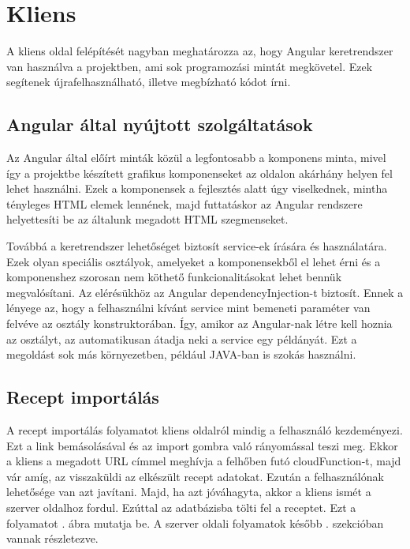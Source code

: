 \documentclass[12pt]{report}
\theoremstyle{definition}
\begin{document}
\section{Kliens}
A kliens oldal felépítését nagyban meghatározza az, hogy Angular keretrendszer van használva a projektben, ami sok programozási mintát megkövetel. Ezek segítenek újrafelhasználható, illetve megbízható kódot írni.



\subsection{Angular által nyújtott szolgáltatások}
Az Angular által előírt minták közül a legfontosabb a komponens minta, mivel így a projektbe  készített grafikus komponenseket az oldalon akárhány helyen fel lehet használni. Ezek a komponensek a fejlesztés alatt úgy viselkednek, mintha tényleges HTML elemek lennének, majd futtatáskor az Angular rendszere helyettesíti be az általunk megadott HTML szegmenseket.

Továbbá a keretrendszer lehetőséget biztosít service-ek írására és használatára. Ezek olyan speciális osztályok, amelyeket a komponensekből el lehet érni és a komponenshez szorosan nem köthető funkcionalitásokat lehet bennük megvalósítani. Az elérésükhöz az Angular \gls{dependencyInjection}-t biztosít. Ennek a lényege az, hogy a felhasználni kívánt service mint bemeneti paraméter van felvéve az osztály konstruktorában. Így, amikor az Angular-nak létre kell hoznia az osztályt, az automatikusan átadja neki a service egy példányát.  Ezt a megoldást sok más környezetben, például \Gls{JAVA}-ban is szokás használni.

\subsection{Recept importálás}
A recept importálás folyamatot kliens oldalról mindig a felhasználó kezdeményezi.
Ezt a link bemásolásával és az import gombra való rányomással teszi meg. 
Ekkor a kliens a megadott URL címmel meghívja a felhőben futó \gls{cloudFunction}-t, majd vár amíg, az visszaküldi az elkészült recept adatokat. 
Ezután a felhasználónak lehetősége van azt javítani. Majd, ha azt jóváhagyta, akkor a kliens ismét a szerver oldalhoz fordul. 
Ezúttal az adatbázisba tölti fel a receptet. Ezt a folyamatot \az{\ref{fig:clientRecipeImport}}. ábra mutatja be.
A szerver oldali folyamatok később \az{\ref{serverImportsRecipe}}. szekcióban vannak részletezve.
\end{document}
